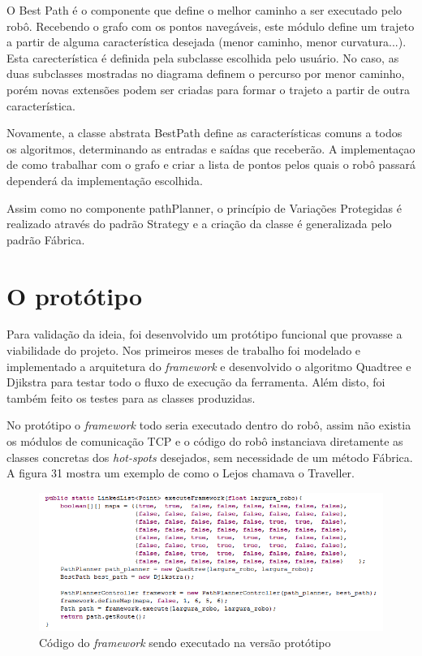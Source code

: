 O Best Path é o componente que define o melhor caminho a ser executado pelo robô. Recebendo o grafo com os pontos navegáveis, este módulo define um trajeto a partir de alguma característica desejada (menor caminho, menor curvatura...). Esta carecterística é definida pela subclasse escolhida pelo usuário. No caso, as duas subclasses mostradas no diagrama definem o percurso por menor caminho, porém novas extensões podem ser criadas para formar o trajeto a partir de outra característica.

Novamente, a classe abstrata BestPath define as características comuns a todos os algoritmos, determinando as entradas e saídas que receberão. A implementaçao de como trabalhar com o grafo e criar a lista de pontos pelos quais o robô passará dependerá da implementação escolhida.

Assim como no componente pathPlanner, o princípio de Variações Protegidas é realizado através do padrão Strategy e a criação da classe é generalizada pelo padrão Fábrica.

\section{O protótipo}

Para validação da ideia, foi desenvolvido um protótipo funcional que provasse a viabilidade do projeto. Nos primeiros meses de trabalho foi modelado e implementado a arquitetura do \textit{framework} e desenvolvido o algoritmo Quadtree e Djikstra para testar todo o fluxo de execução da ferramenta. Além disto, foi também feito os testes para as classes produzidas.

No protótipo o \textit{framework} todo seria executado dentro do robô, assim não existia os módulos de comunicação TCP e o código do robô instanciava diretamente as classes concretas dos \textit{hot-spots} desejados, sem necessidade de um método Fábrica. A figura 31 mostra um exemplo de como o Lejos chamava o Traveller.

\begin{figure}[h]
	\centering
	\label{fig31}
		\includegraphics[keepaspectratio=true,scale=0.8]{figuras/codigoprototipo.PNG}
	\caption{Código do \textit{framework} sendo executado na versão protótipo}
\end{figure}

